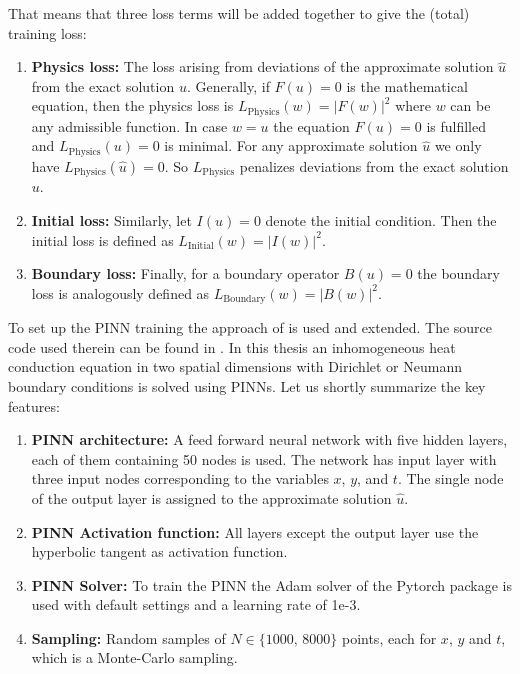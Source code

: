 \documentclass[a4paper,11pt]{article}
\theoremstyle{plain} %
\theoremstyle{definition} %
\theoremstyle{remark} %
\theoremstyle{remark}
\def\uTemp{u}
\begin{document}
That means that three loss terms will be added together to give the (total) training loss:
\begin{enumerate}
\item {\bf Physics loss:} The loss arising from deviations of the approximate solution $\hat{\uTemp}$ from the exact solution $u$. Generally, if $F(\uTemp) = 0$ is the mathematical equation, then the physics loss is $L_{\mathrm{Physics}} (w) = |F(w)|^2 $ where $w$ can be any admissible function. In case $w=\uTemp$ the equation $F(u) = 0$ is fulfilled and $L_{\mathrm{Physics}} (\uTemp) = 0 $ is minimal. For any approximate solution $\hat{\uTemp} $ we only have $L_{\mathrm{Physics}} (\hat{\uTemp}) = 0 $. So $L_{\mathrm{Physics}} $ penalizes deviations from the exact solution $\uTemp$.
\item {\bf Initial loss:} Similarly, let $I(\uTemp) = 0$ denote the initial condition. Then the initial loss is defined as $L_{\mathrm{Initial}} (w) = |I(w)|^2 $.
\item {\bf Boundary loss:} Finally, for a boundary operator $B(\uTemp) =0 $ the boundary loss is analogously defined as $L_{\mathrm{Boundary}} (w) = |B(w)|^2 $.
\end{enumerate}
To set up the PINN training the approach of \cite{aryal2024a} is used and extended. The source code used therein can be found in \cite{aryal2024b}. In this thesis an inhomogeneous heat conduction equation in two spatial dimensions with Dirichlet or Neumann boundary conditions is solved using PINNs. Let us shortly summarize the key features:
\begin{enumerate}
\item {\bf PINN architecture:} A feed forward neural network with five hidden layers, each of them containing 50 nodes is used. The network has input layer with three input nodes corresponding to the variables $x$, $y$, and $t$. The single node of the output layer is assigned to the approximate solution $\hat{u}$. 
\item {\bf PINN Activation function:} All layers except the output layer use the hyperbolic tangent as activation function.
\item {\bf PINN Solver:} To train the PINN the Adam solver of the Pytorch package is used with default settings and a learning rate of 1e-3.
\item {\bf Sampling:} Random samples of $N \in \{ 1000,\, 8000 \} $ points, each for $x$, $y$ and $t$, which is a Monte-Carlo sampling.
\end{enumerate}
\end{document}
